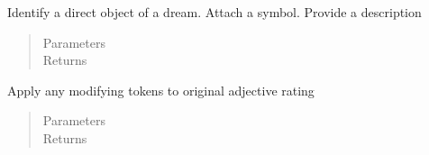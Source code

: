 \documentclass[letterpaper,10pt,english]{sphinxmanual}
\begin{document}
\begin{fulllineitems}
\begin{fulllineitems}
\label{\detokenize{index:Fralysis.AnalyseDream.AnalyseDream.topic_rating_dirobj_description_of}}
Identify a direct object of a dream. Attach a symbol. Provide a description
\begin{quote}\begin{description}
\item[{Parameters}] \leavevmode
{} \textendash{} 

\item[{Returns}] \leavevmode


\end{description}\end{quote}

\end{fulllineitems}


\end{fulllineitems}


\begin{fulllineitems}
\label{\detokenize{index:Fralysis.AnalyseDream.combine_ratings}}
Apply any modifying tokens to original adjective rating
\begin{quote}\begin{description}
\item[{Parameters}] \leavevmode
{} \textendash{} 

\item[{Returns}] \leavevmode


\end{description}\end{quote}

\end{fulllineitems}

\end{document}

